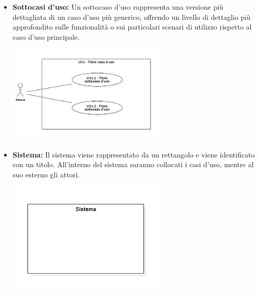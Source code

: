 \begin{itemize}
    \item \textbf{Sottocasi d'uso:}
    Un sottocaso d'uso rappresenta una versione più dettagliata di un caso d'uso più generico, offrendo un livello di dettaglio più approfondito sulle funzionalità o sui particolari scenari di utilizzo rispetto al caso d'uso principale.
    \begin{minipage}[t]{\linewidth}
        \centering
        \includegraphics[width=0.6\textwidth]{../Images/NormeDiProgetto/SottocasoD'Uso.PNG}
    \end{minipage}

    \item \textbf{Sistema:}
    Il sistema viene rappresentato da un rettangolo e viene identificato con un titolo. All'interno del sistema saranno collocati i casi d'uso, mentre al suo esterno gli attori.
    \begin{minipage}[t]{\linewidth}
        \centering
        \includegraphics[width=0.6\textwidth]{../Images/NormeDiProgetto/Sistema.PNG}
    \end{minipage}


\end{itemize}
